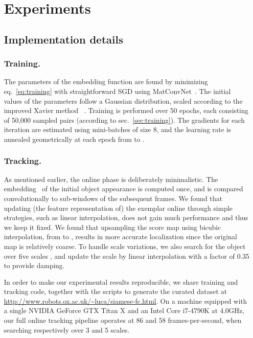 \documentclass[runningheads]{llncs}
\begin{document}
\section{Experiments}


\subsection{Implementation details}

\subsubsection{Training.}
The parameters of the embedding function are found by minimizing eq.~\ref{eq:training} with straightforward SGD using MatConvNet~\cite{vedaldi15matconvnet}.
The initial values of the parameters follow a Gaussian distribution, scaled according to the improved Xavier method~ \cite{he2015delving}.
Training is performed over 50 epochs, each consisting of 50,000 sampled pairs (according to sec.~\ref{sec:training}).
The gradients for each iteration are estimated using mini-batches of size 8, and the learning rate is annealed geometrically at each epoch from  to .


\subsubsection{Tracking.}
As mentioned earlier, the online phase is deliberately minimalistic. The embedding~ of the initial object appearance is computed once, and is compared convolutionally to sub-windows of the subsequent frames.
We found that updating (the feature representation of) the exemplar online through simple strategies, such as linear interpolation, does not gain much performance and thus we keep it fixed.
We found that upsampling the score map using bicubic interpolation, from  to , results in more accurate localization since the original map is relatively coarse.
To handle scale variations, we also search for the object over five scales , and update the scale by linear interpolation with a factor of 0.35 to provide damping.

In order to make our experimental results reproducible, we share training and tracking code, together with the scripts to generate the curated dataset at \url{http://www.robots.ox.ac.uk/~luca/siamese-fc.html}.
On a machine equipped with a single NVIDIA GeForce GTX Titan X and an Intel Core i7-4790K at 4.0GHz, our full online tracking pipeline operates at 86 and 58 frames-per-second, when searching respectively over 3 and 5 scales.
\end{document}
